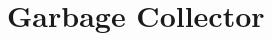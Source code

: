 \documentclass[11pt,fleqn,openany]{book} %
\begin{document}


\chapter{Garbage Collector}
\label{chapter:garbage-collector}
\end{document}
